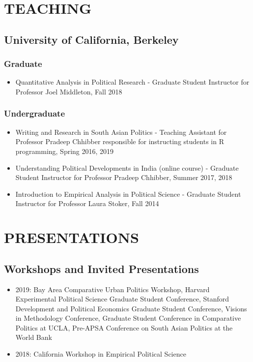 \documentclass[11pt]{article}
\begin{document}
\vspace{3mm}
\section*{TEACHING}


\subsection*{University of California, Berkeley}
\subsubsection*{Graduate}
\begin{itemize}
	\item[]Quantitative Analysis in Political Research - Graduate Student Instructor for Professor Joel Middleton, Fall 2018 
\end{itemize}
\subsubsection*{Undergraduate}
\begin{itemize}
		\item[]Writing and Research in South Asian Politics - Teaching Assistant for Professor Pradeep Chhibber responsible for instructing students in \textsf{R} programming, Spring 2016, 2019
	\item[]Understanding Political Developments in India (online course) - Graduate Student Instructor for Professor Pradeep Chhibber, Summer 2017, 2018
	\item[]Introduction to Empirical Analysis in Political Science - Graduate Student Instructor for Professor Laura Stoker, Fall 2014	
\end{itemize}

\vspace{3mm}
\section*{PRESENTATIONS}
\subsection*{Workshops and Invited Presentations}
\begin{itemize}[nosep]
\item[] 2019: Bay Area Comparative Urban Politics Workshop, Harvard Experimental Political Science Graduate Student Conference, Stanford Development and Political Economics Graduate Student Conference, Visions in Methodology Conference, Graduate Student Conference in Comparative Politics at UCLA, Pre-APSA Conference on South Asian Politics at the World Bank

\item[] 2018: California Workshop in Empirical Political Science
\end{itemize}
\end{document}
